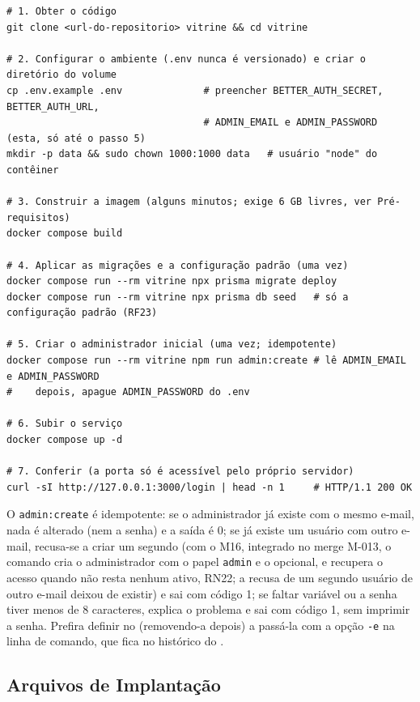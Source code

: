 \begin{lstlisting}[language=VSh, caption={Roteiro de instalação em VPS com Docker}, label={lst:instalacao}]
# 1. Obter o código
git clone <url-do-repositorio> vitrine && cd vitrine

# 2. Configurar o ambiente (.env nunca é versionado) e criar o diretório do volume
cp .env.example .env              # preencher BETTER_AUTH_SECRET, BETTER_AUTH_URL,
                                  # ADMIN_EMAIL e ADMIN_PASSWORD (esta, só até o passo 5)
mkdir -p data && sudo chown 1000:1000 data   # usuário "node" do contêiner

# 3. Construir a imagem (alguns minutos; exige 6 GB livres, ver Pré-requisitos)
docker compose build

# 4. Aplicar as migrações e a configuração padrão (uma vez)
docker compose run --rm vitrine npx prisma migrate deploy
docker compose run --rm vitrine npx prisma db seed   # só a configuração padrão (RF23)

# 5. Criar o administrador inicial (uma vez; idempotente)
docker compose run --rm vitrine npm run admin:create # lê ADMIN_EMAIL e ADMIN_PASSWORD
#    depois, apague ADMIN_PASSWORD do .env

# 6. Subir o serviço
docker compose up -d

# 7. Conferir (a porta só é acessível pelo próprio servidor)
curl -sI http://127.0.0.1:3000/login | head -n 1     # HTTP/1.1 200 OK
\end{lstlisting}

O \texttt{admin:create} é idempotente: se o administrador já existe com o mesmo e-mail, nada é alterado (nem a senha) e a saída é 0; se já existe um usuário com outro e-mail, recusa-se a criar um segundo (com o M16, integrado no merge M-013, o comando cria o administrador com o papel \texttt{admin} e o  opcional, e recupera o acesso quando não resta nenhum ativo, RN22; a recusa de um segundo usuário de outro e-mail deixou de existir) e sai com código 1; se faltar variável ou a senha tiver menos de 8 caracteres, explica o problema e sai com código 1, sem imprimir a senha. Prefira definir  no  (removendo-a depois) a passá-la com a opção \texttt{-e} na linha de comando, que fica no histórico do .

\subsection{Arquivos de Implantação}\label{sec:impl-arquivos}

